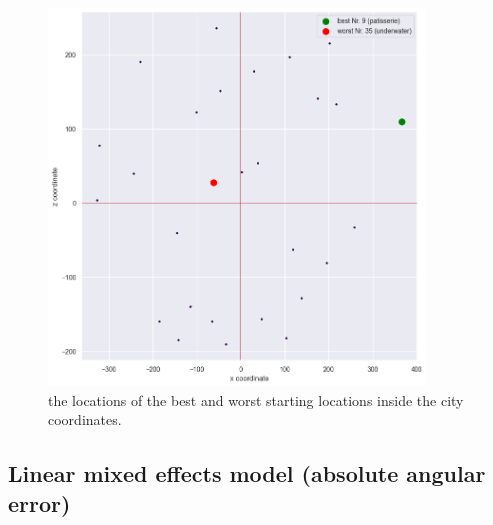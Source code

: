 \begin{figure}[h]
	\centering
	\includegraphics[width=100mm]{figures/best_worst_starting_locations.png}
	\caption[Locations of best and worst starting locations in city]{the locations of the best and worst starting locations inside the city coordinates.}
	\label{fig:best_worst_locs}
\end{figure}



\subsection{Linear mixed effects model (absolute angular error)}


